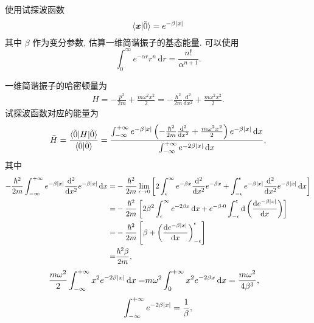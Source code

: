 \documentclass{assignment}
\begin{document}
\begin{prob}[课本习题 5.20]
    使用试探波函数
    \[
        \langle\bm{x}\vert\tilde{0}\rangle=e^{-\beta\left\lvert x\right\rvert}
    \]
    其中 $\beta$ 作为变分参数, 估算一维简谐振子的基态能量. 可以使用
    \[
        \int_0^{\infty}e^{-\alpha r}r^n\,\mathrm{d}r=\frac{n!}{\alpha^{n+1}}.
    \]
\end{prob}
\begin{sol}
    一维简谐振子的哈密顿量为
    \begin{align}
        H=-\frac{p^2}{2m}+\frac{m\omega^2x^2}{2}=-\frac{\hbar^2}{2m}\frac{\mathrm{d}^2}{\mathrm{d}x^2}+\frac{m\omega^2x^2}{2}.
    \end{align}
    试探波函数对应的能量为
    \begin{align}
        \bar{H}=\frac{\langle\tilde{0}\rvert H\lvert\tilde{0}\rangle}{\langle\tilde{0}\vert\tilde{0}\rangle}=\frac{\int_{-\infty}^{+\infty}e^{-\beta\left\lvert x\right\rvert}\left(-\frac{\hbar^2}{2m}\frac{\mathrm{d}^2}{\mathrm{d}x^2}+\frac{m\omega^2x^2}{2}\right)e^{-\beta\left\lvert x\right\rvert}\,\mathrm{d}x}{\int_{-\infty}^{+\infty}e^{-2\beta\left\lvert x\right\rvert}\,\mathrm{d}x},
    \end{align}
    其中
    \begin{align}
        \notag-\frac{\hbar^2}{2m}\int_{-\infty}^{+\infty}e^{-\beta\left\lvert x\right\rvert}\frac{\mathrm{d}^2}{\mathrm{d}x^2}e^{-\beta\left\lvert x\right\rvert}\,\mathrm{d}x=&-\frac{\hbar^2}{2m}\lim_{\epsilon\rightarrow 0}\left[2\int_{\epsilon}^{\infty}e^{-\beta x}\frac{\mathrm{d}^2}{\mathrm{d}x^2}e^{-\beta x}+\int_{-\epsilon}^{\epsilon}e^{-\beta\left\lvert x\right\rvert}\frac{\mathrm{d}^2}{\mathrm{d}x^2}e^{-\beta\left\lvert x\right\rvert}\,\mathrm{d}x\right]\\
        \notag=&-\frac{\hbar^2}{2m}\left[2\beta^2\int_{\epsilon}^{\infty}e^{-2\beta x}\,\mathrm{d}x+e^{-\beta\cdot 0}\int_{-\epsilon}^{\epsilon}\mathrm{d}\left(\frac{\mathrm{d}e^{-\beta\left\lvert x\right\rvert}}{\mathrm{d}x}\right)\right]\\
        \notag=&-\frac{\hbar^2}{2m}\left[\beta+\left(\frac{\mathrm{d}e^{-\beta\left\lvert x\right\rvert}}{\mathrm{d}x}\right)_{-\epsilon}^{\epsilon}\right]\\
        =&\frac{\hbar^2\beta}{2m},
    \end{align}
    \begin{align}
        \frac{m\omega^2}{2}\int_{-\infty}^{+\infty}x^2e^{-2\beta\left\lvert x\right\rvert}\,\mathrm{d}x=&m\omega^2\int_0^{+\infty}x^2e^{-2\beta x}\,\mathrm{d}x=\frac{m\omega^2}{4\beta^3},
    \end{align}
    \begin{align}
        \int_{-\infty}^{+\infty}e^{-2\beta\abs{x}}=\frac{1}{\beta},

\end{align}
\end{sol}
\end{document}
